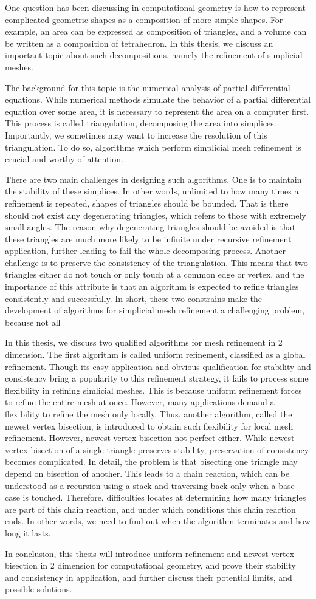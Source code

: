 One question has been discussing in computational geometry is how to represent complicated geometric shapes as a composition of more simple shapes. For example, an area can be expressed as composition of triangles, and a volume can be written as a composition of tetrahedron. In this thesis, we discuss an important topic about such decompositions, namely the refinement of simplicial meshes.

The background for this topic is the numerical analysis of partial differential equations. While numerical methods simulate the behavior of a partial differential equation over some area, it is necessary  to represent the area on a computer first. This process is called triangulation, decomposing the area into simplices. Importantly, we sometimes may want to increase the resolution of this triangulation. To do so, algorithms which perform simplicial mesh refinement is crucial and worthy of attention. 

There are two main challenges in designing such algorithms. One is to maintain the stability of these simplices. In other words, unlimited to how many times a refinement is repeated, shapes of triangles should be bounded. That is there should not exist any degenerating triangles, which refers to those with extremely small angles. The reason why degenerating triangles should be avoided is that these triangles are much more likely to be infinite under recursive refinement application, further leading to fail the whole decomposing process. Another challenge is to  preserve the consistency of the triangulation. This means that two triangles either do not touch or only touch at a common edge or vertex, and the importance of this attribute is that an algorithm is expected to refine triangles consistently and successfully. In short, these two constrains make the development of algorithms for simplicial mesh refinement a challenging problem, because not all  

In this thesis, we discuss two qualified algorithms for mesh refinement in 2 dimension. The first algorithm is called uniform refinement, classified as a global refinement. Though its easy application and obvious qualification for stability and consistency bring a popularity to this refinement strategy, it fails to process some flexibility in refining simlicial meshes. This is because uniform refinement forces to refine the entire mesh at once. However, many applications demand a flexibility to refine the mesh only locally. Thus, another algorithm, called the newest vertex bisection, is introduced to obtain such flexibility for local mesh refinement. However, newest vertex bisection not perfect either. While newest vertex bisection of a single triangle preserves stability, preservation of consistency becomes complicated. In detail, the problem is that bisecting one triangle may depend on bisection of another. This leads to a chain reaction, which can be understood as a recursion using a stack and traversing back only when a base case is touched. Therefore, difficulties locates at determining how many triangles are part of this chain reaction, and under which conditions this chain reaction ends. In other words, we need to find out when the algorithm terminates and how long it lasts. 

In conclusion, this thesis will introduce uniform refinement and newest vertex bisection in 2 dimension for computational geometry, and prove their stability and consistency in application, and further discuss their potential limits, and possible solutions.